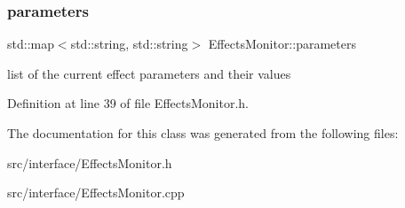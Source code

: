 \subsubsection{\texorpdfstring{parameters}{parameters}}
{\footnotesize\ttfamily std\+::map$<$std\+::string, std\+::string$>$ Effects\+Monitor\+::parameters}

list of the current effect parameters and their values 

Definition at line 39 of file Effects\+Monitor.\+h.



The documentation for this class was generated from the following files\+:\begin{DoxyCompactItemize}
\item 
src/interface/Effects\+Monitor.\+h\item 
src/interface/Effects\+Monitor.\+cpp\end{DoxyCompactItemize}
